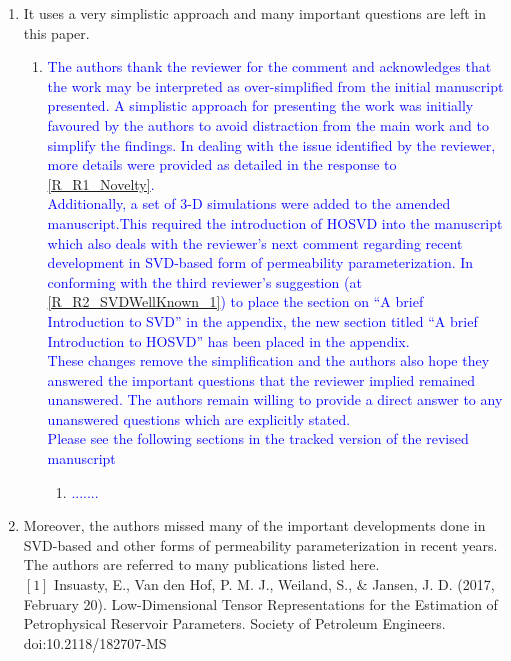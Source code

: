 \documentclass[11pt]{letter} %
\newcommand{\blue}{\textcolor{blue}}
\begin{document}
\begin{letter}
{\begin{enumerate}
\begin{enumerate}
\begin{enumerate}
   \begin{enumerate}
 \item \blue{.......}
   \end{enumerate}
      \end{enumerate}
    \item \label{R_R1_OverSimplification} It uses a very simplistic approach and many important questions are left in this paper.
      \begin{enumerate}
      \item \label{R_R1_OverSimplification_P1} \blue{The authors thank the reviewer for the comment and acknowledges that the work may be interpreted as over-simplified from the initial manuscript presented. A simplistic approach for presenting the work was initially favoured by the authors to avoid distraction from the main work and to simplify the findings. In dealing with the issue identified by the reviewer, more details were provided as detailed in the response to \ref{R_R1_Novelty}.\\
        Additionally, a set of 3-D simulations were added to the amended manuscript.This required the introduction of HOSVD into the manuscript which also deals with the reviewer's next comment regarding recent development in SVD-based form of permeability parameterization. In conforming with the third reviewer's suggestion (at \ref{R_R2_SVDWellKnown_1}) to place the section on ``A brief Introduction to SVD'' in the appendix, the new section titled ``A brief Introduction to HOSVD'' has been placed in the appendix. \\
        These changes remove the simplification and the authors also hope they answered the important questions that the reviewer implied remained unanswered. The authors remain willing to provide a direct answer to any unanswered questions which are explicitly stated.}\\
        \blue{Please see the following sections in the tracked version of the revised manuscript}
   \begin{enumerate}
 \item \blue{.......}
   \end{enumerate}
        \end{enumerate}
    \item \label{R_R1_MissedNewDev}Moreover, the authors missed many of the important developments done in SVD-based and other forms of permeability  parameterization in recent years. The authors are referred to many publications listed here.\\
$[1]$ Insuasty, E., Van den Hof, P. M. J., Weiland, S., \& Jansen, J. D. (2017, February 20). Low-Dimensional Tensor Representations for the Estimation of Petrophysical Reservoir Parameters. Society of Petroleum Engineers. doi:10.2118/182707-MS\\

\end{enumerate}
\end{enumerate}}
\end{letter}
\end{document}
